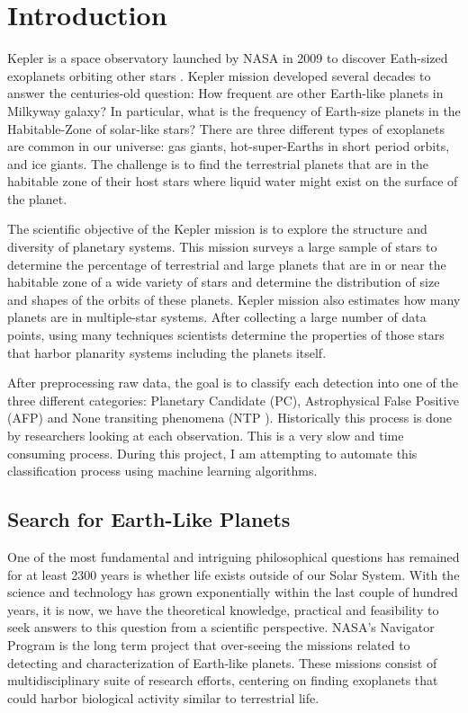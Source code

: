 \chapter{Introduction}



Kepler is a space observatory launched by NASA in 2009 to discover Eath-sized exoplanets orbiting other stars  \cite{2010ApJ...713L..87J}. Kepler mission developed several decades to answer the centuries-old question: How frequent are other Earth-like planets in Milkyway galaxy? In particular, what is the frequency of Earth-size planets in the Habitable-Zone of solar-like stars? There are three different types of exoplanets are common in our universe: gas giants, hot-super-Earths in short period orbits, and ice giants. The challenge is to find the terrestrial planets that are in the habitable zone of their host stars where liquid water might exist on the surface of the planet.

The scientific objective of the Kepler mission is to explore the structure and diversity of planetary systems. This mission surveys a large sample of stars to determine the percentage of terrestrial and large planets that are in or near the habitable zone of a wide variety of stars and determine the distribution of size and shapes of the orbits of these planets. Kepler mission also estimates how many planets are in multiple-star systems. After collecting a large number of data points, using many techniques scientists determine the properties of those stars that harbor planarity systems including the planets itself. 

After preprocessing raw data, the goal is to classify each detection into one of the three different categories: Planetary Candidate (PC), Astrophysical False Positive (AFP) and None transiting phenomena (NTP ). Historically this process is done by researchers looking at each observation. This is a very slow and time consuming process. During this project, I am attempting to automate this classification process using machine learning algorithms.

\section{Search for Earth-Like Planets}
One of the most fundamental and intriguing philosophical questions has remained for at least 2300 years is whether life exists outside of our Solar System. With the science and technology has grown exponentially within the last couple of hundred years, it is now, we have the theoretical knowledge, practical and feasibility to seek answers to this question from a scientific perspective. NASA's Navigator Program is the long term project that over-seeing the missions related to  detecting and characterization of Earth-like planets. These missions consist of multidisciplinary suite of research efforts, centering on finding exoplanets that could harbor biological activity similar to terrestrial life.


